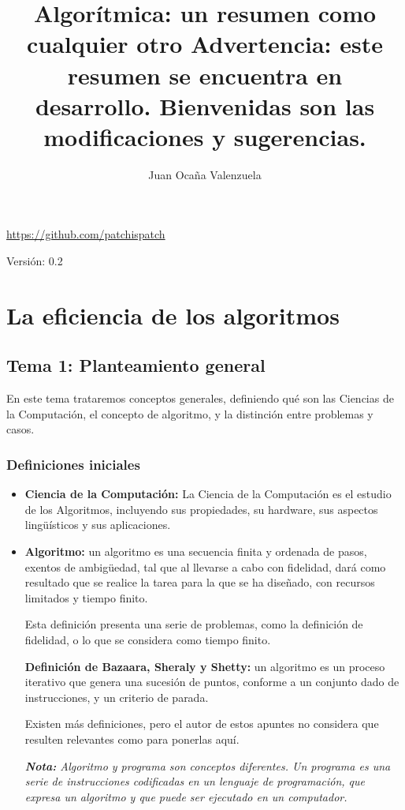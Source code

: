 \documentclass[11pt,a4paper]{article}
\author{	Juan Ocaña Valenzuela}
\title{\textbf{Algorítmica: un resumen como cualquier otro} 
 Advertencia: este resumen se encuentra en desarrollo. Bienvenidas son las modificaciones y sugerencias.}
\begin{document}
\thispagestyle{empty}

\maketitle

\begin{center}
\url{https://github.com/patchispatch}

\medskip

Versión: 0.2
\end{center}

\newpage

\tableofcontents

\newpage

\section{La eficiencia de los algoritmos}

\subsection{Tema 1: Planteamiento general}

En este tema trataremos conceptos generales, definiendo qué son las Ciencias de la Computación, el concepto de algoritmo, y la distinción entre problemas y casos. 

\subsubsection{Definiciones iniciales}

\begin{itemize}

\item \textbf{Ciencia de la Computación:} La Ciencia de la Computación es el estudio de los Algoritmos, incluyendo sus propiedades, su hardware, sus aspectos lingüísticos y sus aplicaciones.

\item \textbf{Algoritmo:} un algoritmo es una secuencia finita y ordenada de pasos, exentos de ambigüedad, tal que al llevarse a cabo con fidelidad, dará como resultado que se realice la tarea para la que se ha diseñado, con recursos limitados y tiempo finito.

\smallskip

Esta definición presenta una serie de problemas, como la definición de fidelidad, o lo que se considera como tiempo finito. 

\medskip

\textbf{Definición de Bazaara, Sheraly y Shetty:} un algoritmo es un proceso iterativo que genera una sucesión de puntos, conforme a un conjunto dado de instrucciones, y un criterio de parada.

\bigskip

Existen más definiciones, pero el autor de estos apuntes no considera que resulten relevantes como para ponerlas aquí.

\textit{\textbf{Nota:} Algoritmo y programa son conceptos diferentes. Un programa es una serie de instrucciones codificadas en un lenguaje de programación, que expresa un algoritmo y que puede ser ejecutado en un computador.}
\end{itemize}
\end{document}
